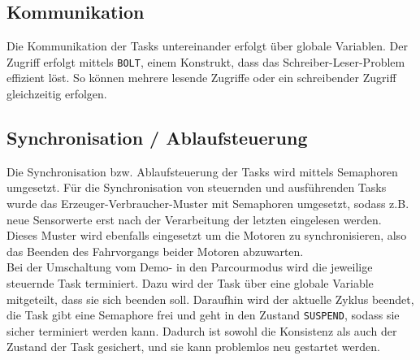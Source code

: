 \subsection{Kommunikation}
Die Kommunikation der Tasks untereinander erfolgt über globale Variablen. Der Zugriff erfolgt mittels \texttt{BOLT}, einem Konstrukt, dass das Schreiber-Leser-Problem effizient löst. So können mehrere lesende Zugriffe oder ein schreibender Zugriff gleichzeitig erfolgen.

\subsection{Synchronisation / Ablaufsteuerung}
Die Synchronisation bzw. Ablaufsteuerung der Tasks wird mittels Semaphoren umgesetzt. Für die Synchronisation von steuernden und ausführenden Tasks wurde das Erzeuger-Verbraucher-Muster mit Semaphoren umgesetzt, sodass z.B. neue Sensorwerte erst nach der Verarbeitung der letzten eingelesen werden. Dieses Muster wird ebenfalls eingesetzt um die Motoren zu synchronisieren, also das Beenden des Fahrvorgangs beider Motoren abzuwarten.\\
Bei der Umschaltung vom Demo- in den Parcourmodus wird die jeweilige steuernde Task terminiert. Dazu wird der Task über eine globale Variable mitgeteilt, dass sie sich beenden soll. Daraufhin wird der aktuelle Zyklus beendet, die Task gibt eine Semaphore frei und geht in den Zustand \texttt{SUSPEND}, sodass sie sicher terminiert werden kann. Dadurch ist sowohl die Konsistenz als auch der Zustand der Task gesichert, und sie kann problemlos neu gestartet werden.

